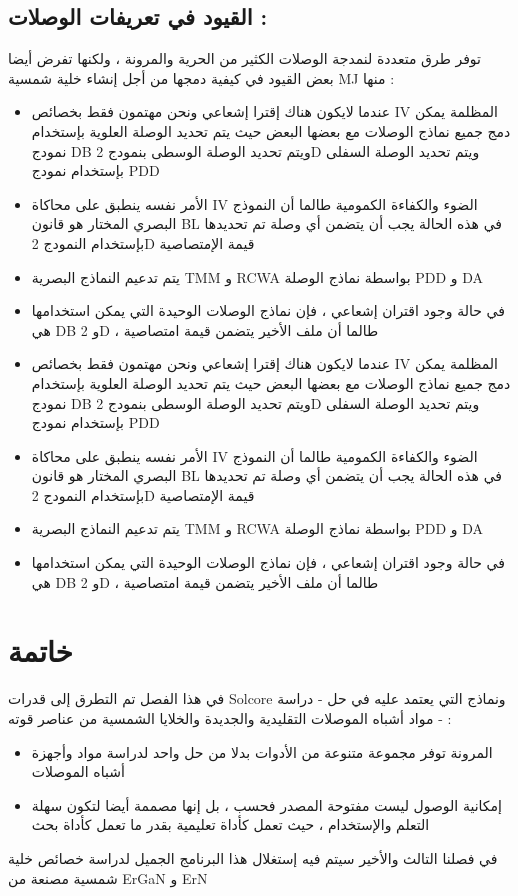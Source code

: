 \subsection{  القيود في تعريفات الوصلات :  }
توفر طرق متعددة لنمدجة الوصلات الكثير من الحرية والمرونة ، ولكنها تفرض أيضا بعض القيود في كيفية دمجها من أجل إنشاء خلية شمسية   MJ  منها :
\begin{itemize}
	\item  عندما لايكون هناك إقترا إشعاعي ونحن مهتمون فقط بخصائص IV المظلمة  يمكن دمج جميع نماذج الوصلات مع بعضها البعض حيث يتم تحديد الوصلة العلوية بإستخدام نمودج   DB ويتم تحديد الوصلة الوسطى  بنمودج 2D ويتم تحديد الوصلة السفلى بإستخدام نمودج PDD
	\item  الأمر نفسه ينطبق على محاكاة   IV الضوء  والكفاءة الكمومية  طالما أن النموذج البصري المختار هو قانون BL في هذه الحالة  يجب أن يتضمن أي وصلة تم تحديدها بإستخدام النمودج 2D قيمة الإمتصاصية
	\item يتم تدعيم النماذج البصرية TMM و RCWA بواسطة نماذج الوصلة PDD و DA
	\item في  حالة وجود اقتران إشعاعي ،  فإن نماذج  الوصلات الوحيدة التي يمكن استخدامها هي DB و 2D ، طالما أن  ملف  الأخير يتضمن  قيمة امتصاصية
\end{itemize}\begin{itemize}
	\item  عندما لايكون هناك إقترا إشعاعي ونحن مهتمون فقط بخصائص IV المظلمة  يمكن دمج جميع نماذج الوصلات مع بعضها البعض حيث يتم تحديد الوصلة العلوية بإستخدام نمودج   DB ويتم تحديد الوصلة الوسطى  بنمودج 2D ويتم تحديد الوصلة السفلى بإستخدام نمودج PDD 
	\item  الأمر نفسه ينطبق على محاكاة   IV الضوء  والكفاءة الكمومية  طالما أن النموذج البصري المختار هو قانون BL في هذه الحالة  يجب أن يتضمن أي وصلة تم تحديدها بإستخدام النمودج 2D قيمة الإمتصاصية
	\item يتم تدعيم النماذج البصرية TMM و RCWA بواسطة نماذج الوصلة PDD و DA
	\item في  حالة وجود اقتران إشعاعي ،  فإن نماذج  الوصلات الوحيدة التي يمكن استخدامها هي DB و 2D ، طالما أن  ملف  الأخير يتضمن  قيمة امتصاصية  
\end{itemize}
\section{ خاتمة }
في هذا الفصل تم التطرق إلى قدرات Solcore ونماذج التي يعتمد عليه في حل - دراسة - مواد أشباه الموصلات التقليدية والجديدة والخلايا الشمسية من عناصر قوته :
\begin{itemize}
	\item 
	
	المرونة توفر مجموعة متنوعة من الأدوات بدلا من حل واحد لدراسة مواد وأجهزة أشباه الموصلات  
	\item  
	إمكانية الوصول ليست مفتوحة المصدر فحسب ، بل إنها مصممة أيضا لتكون سهلة التعلم والإستخدام ، حيث تعمل كأداة تعليمية بقدر ما تعمل كأداة بحث 
\end{itemize}
في فصلنا التالث والأخير سيتم  فيه إستغلال هذا البرنامج الجميل لدراسة خصائص خلية شمسية مصنعة من ErGaN و  ErN


